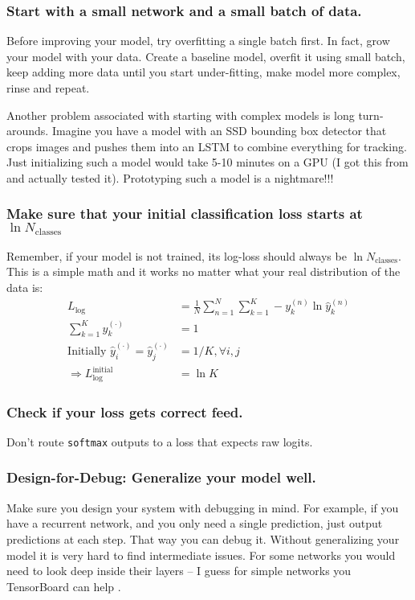 \subsubsection*{Start with a small network and a small batch of data.}
Before improving your model, try overfitting a single batch first.
In fact, grow your model with your data.
Create a baseline model, overfit it using small batch, keep adding more data until you start under-fitting, make model more complex, rinse and repeat.

Another problem associated with starting with complex models is long turn-arounds.
Imagine you have a model with an SSD bounding box detector that crops images and pushes them into an LSTM to combine everything for tracking.
Just initializing such a model would take 5-10 minutes on a GPU (I got this from \cite{twitter:karpathy:nn:300618} and actually tested it).
Prototyping such a model is a nightmare!!!

\subsubsection*{Make sure that your initial classification loss starts at $\ln N_\text{classes}$}
Remember, if your model is not trained, its log-loss should always be $\ln N_\text{classes}$.
This is a simple math and it works no matter what your real distribution of the data is:
\begin{align*}
L_\text{log} &= \frac{1}{N}\sum_{n=1}^{N}\sum_{k=1}^{K}-y_k^{(n)}\ln\hat{y}_k^{(n)} \\
\sum_{k=1}^{K}y_k^{(\cdot)} &= 1 \\
\text{Initially } \hat{y}_i^{(\cdot)} = \hat{y}_j^{(\cdot)} &= 1/K, \forall{i,j}\\
\Rightarrow L_\text{log}^\text{initial} &= \ln{K}
\end{align*}

\subsubsection*{Check if your loss gets correct feed.}
Don't route \verb+softmax+ outputs to a loss that expects raw logits.

\subsubsection*{Design-for-Debug: Generalize your model well.}
Make sure you design your system with debugging in mind.
For example, if you have a recurrent network, and you only need a single prediction, just output predictions at each step.
That way you can debug it.
Without generalizing your model it is very hard to find intermediate issues.
For some networks you would need to look deep inside their layers -- I guess for simple networks you TensorBoard can help \cite{tensorflow2015-whitepaper}.

